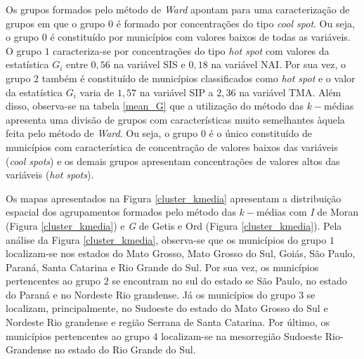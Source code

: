 \documentclass[
	12pt,				%
	openright,			%
	oneside,			%
	a4paper,			%
	chapter=TITLE,		%
	section=TITLE,		%
	english,			%
	french,				%
	spanish,			%
	brazil				%
	]{abntex2}
\begin{document}
Os grupos formados pelo método de \textit{Ward} apontam para uma caracterização de grupos em que o grupo $0$ é formado por concentrações do tipo \textit{cool spot}. Ou seja, o grupo $0$ é constituído por municípios com valores baixos de todas as variáveis. O grupo $1$ caracteriza-se por concentrações do tipo \textit{hot spot} com valores da estatística $G_i$ entre $0,56$  na variável SIS e $0,18$ na variável NAI. Por sua vez, o grupo 2 também é constituído de municípios classificados como \textit{hot spot} e o valor da estatística $G_i$ varia de $1,57$ na variável SIP a $2,36$ na variável TMA. Além disso, observa-se na tabela \ref{mean_G} que a utilização do método das $k-$médias apresenta uma divisão de grupos com características muito semelhantes àquela feita pelo método de \textit{Ward}. Ou seja, o grupo $0$ é o único constituído de municípios com característica de concentração de valores baixos das variáveis (\textit{cool spots}) e os demais grupos apresentam concentrações de valores altos das variáveis (\textit{hot spots}).





Os mapas apresentados na Figura \ref{cluster_kmedia} apresentam a distribuição espacial dos agrupamentos formados pelo método das $k-$médias com \textit{I} de Moran (Figura \ref{cluster_kmedia}) e \textit{G} de Getis e Ord (Figura \ref{cluster_kmedia}).  Pela análise da Figura \ref{cluster_kmedia}, observa-se que os municípios do grupo $1$ localizam-se nos estados do Mato Grosso, Mato Grosso do Sul, Goiás, São Paulo, Paraná, Santa Catarina e Rio Grande do Sul. Por sua vez, os municípios pertencentes ao grupo $2$ se encontram no sul do estado se São Paulo, no estado do Paraná e no Nordeste Rio grandense. Já os municípios do grupo $3$ se localizam, principalmente, no Sudoeste do estado do Mato Grosso do Sul e Nordeste Rio grandense e região Serrana de Santa Catarina. Por último, os municípios pertencentes ao grupo $4$ localizam-se na mesorregião Sudoeste Rio-Grandense no estado do Rio Grande do Sul. 
\end{document}
